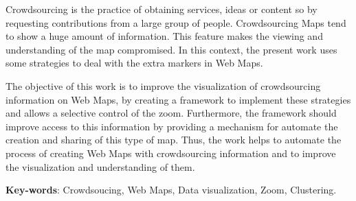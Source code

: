 \documentclass[12pt,oneside,openany,a4paper]{abntex2}	%
\begin{document}
\begin{resumo}[Abstract]
Crowdsourcing is the practice of obtaining services, ideas or content so by requesting contributions from a large group of people. Crowdsourcing Maps tend to show a huge amount of information. This feature makes the viewing and understanding of the map compromised. In this context, the present work uses some strategies to deal with the extra markers in Web Maps.

The objective of this work is to improve the visualization of crowdsourcing information on Web Maps, by creating a framework to implement these strategies and allows a selective control of the zoom. Furthermore, the framework should improve access to this information by providing a mechanism for automate the creation and sharing of this type of map. Thus, the work helps to automate the process of creating Web Maps with crowdsourcing information and  to improve the visualization and understanding of them.

\vspace{\onelineskip}
 
\noindent 
\textbf{Key-words}: Crowdsoucing, Web Maps, Data visualization, Zoom, Clustering.
\end{resumo}


\listoffigures*
\cleardoublepage





\tableofcontents*
\cleardoublepage
\end{document}
